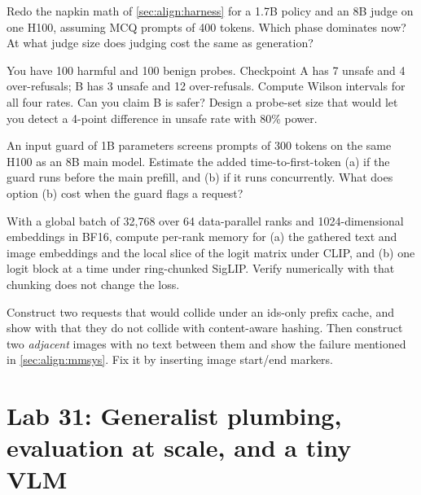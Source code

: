 \begin{exercise}
Redo the napkin math of \cref{sec:align:harness} for a 1.7B policy and an 8B judge on one H100,
assuming MCQ prompts of 400 tokens. Which phase dominates now? At what judge size does judging cost the same
as generation?
\end{exercise}

\begin{exercise}
You have 100 harmful and 100 benign probes. Checkpoint A has 7 unsafe and 4 over-refusals; B has 3 unsafe
and 12 over-refusals. Compute Wilson intervals for all four rates. Can you claim B is safer? Design a
probe-set size that would let you detect a 4-point difference in unsafe rate with 80\% power.
\end{exercise}

\begin{exercise}
An input guard of 1B parameters screens prompts of 300 tokens on the same H100 as an 8B main model. Estimate
the added time-to-first-token (a) if the guard runs before the main prefill, and (b) if it runs
concurrently. What does option (b) cost when the guard flags a request?
\end{exercise}

\begin{exercise}
With a global batch of 32{,}768 over 64 data-parallel ranks and 1024-dimensional embeddings in BF16,
compute per-rank memory for (a) the gathered text and image embeddings and the local slice of the logit matrix
under CLIP, and (b) one logit block at a time under ring-chunked SigLIP. Verify numerically with
 that chunking does not change the loss.
\end{exercise}

\begin{exercise}
Construct two requests that would collide under an ids-only prefix cache, and show with
 that they do not collide with content-aware hashing. Then construct two
\emph{adjacent} images with no text between them and show the failure mentioned in
\cref{sec:align:mmsys}. Fix it by inserting image start/end markers.
\end{exercise}

\section{Lab 31: Generalist plumbing, evaluation at scale, and a tiny VLM}\label{sec:align:lab}

